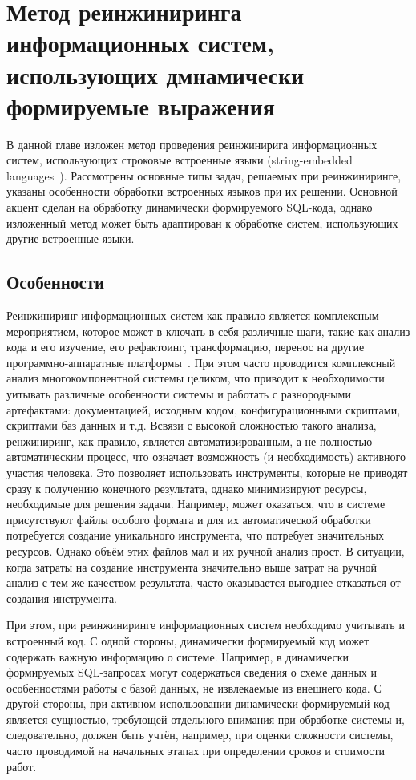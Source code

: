 \chapter{Метод реинжиниринга информационных систем, использующих дмнамически формируемые выражения}

В данной главе изложен метод проведения реинжинирига информационных систем, использующих строковые встроенные языки (string-embedded languages~\cite{Alvor1}). Рассмотрены основные типы задач, решаемых при реинжиниринге, указаны особенности обработки встроенных языков при их решении. Основной акцент сделан на обработку динамически формируемого SQL-кода, однако изложенный метод может быть адаптирован к обработке систем, использующих другие встроенные языки.

\section{Особенности}

Реинжиниринг информационных систем как правило является комплексным мероприятием, которое может в ключать в себя различные шаги, такие как анализ кода и его изучение, его рефактоинг, трансформацию, перенос на другие программно-аппаратные платформы~\cite{reengANT}. При этом часто проводится комплексный анализ многокомпонентной системы целиком, что приводит к необходимости уитывать различные особенности системы и работать с разнородными артефактами: документацией, исходным кодом, конфигурационными скриптами, скриптами баз данных и т.д. Всвязи с высокой сложностью такого анализа, ренжиниринг, как правило, является автоматизированным, а не полностью автоматическим процесс, что означает возможность (и необходимость) активного участия человека. Это позволяет использовать инструменты, которые не приводят сразу к получению конечного результата, однако минимизируют ресурсы, необходимые для решения задачи. Например, может оказаться, что в системе присутствуют файлы особого формата и для их автоматической обработки потребуется создание уникального инструмента, что потребует значительных ресурсов. Однако объём этих файлов мал и их ручной анализ прост. В ситуации, когда затраты на создание инструмента значительно выше затрат на ручной анализ с тем же качеством результата, часто оказывается выгоднее отказаться от создания инструмента.

При этом, при реинжиниринге информационных систем необходимо учитывать и встроенный код. С одной стороны, динамически формируемый код может содержать важную информацию о системе. Например, в динамически формируемых SQL-запросах могут содержаться сведения о схеме данных и особенностями работы с базой данных, не извлекаемые из внешнего кода. С другой стороны, при активном использовании динамически формируемый код является сущностью, требующей отдельного внимания при обработке системы и, следовательно, должен быть учтён, например, при оценки сложности системы, часто проводимой на начальных этапах при определении сроков и стоимости работ.

